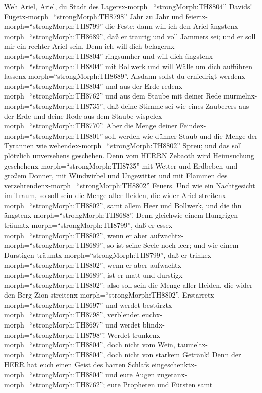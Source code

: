  Weh Ariel, Ariel, du Stadt des
Lagersx-morph=``strongMorph:TH8804'' Davids!
Fügetx-morph=``strongMorph:TH8798'' Jahr zu Jahr und
feiertx-morph=``strongMorph:TH8799'' die Feste;  dann will
ich den Ariel ängstenx-morph=``strongMorph:TH8689'', daß er traurig und
voll Jammers sei; und er soll mir ein rechter Ariel sein. 
Denn ich will dich belagernx-morph=``strongMorph:TH8804'' ringsumher und
will dich ängstenx-morph=``strongMorph:TH8804'' mit Bollwerk und will
Wälle um dich aufführen lassenx-morph=``strongMorph:TH8689''.
 Alsdann sollst du erniedrigt
werdenx-morph=``strongMorph:TH8804'' und aus der Erde
redenx-morph=``strongMorph:TH8762'' und aus dem Staube mit deiner Rede
murmelnx-morph=``strongMorph:TH8735'', daß deine Stimme sei wie eines
Zauberers aus der Erde und deine Rede aus dem Staube
wispelex-morph=``strongMorph:TH8770''.  Aber die Menge
deiner Feindex-morph=``strongMorph:TH8801'' soll werden wie dünner Staub
und die Menge der Tyrannen wie wehendex-morph=``strongMorph:TH8802''
Spreu; und das soll plötzlich unversehens geschehen.  Denn
vom HERRN Zebaoth wird Heimsuchung
geschehenx-morph=``strongMorph:TH8735'' mit Wetter und Erdbeben und
großem Donner, mit Windwirbel und Ungewitter und mit Flammen des
verzehrendenx-morph=``strongMorph:TH8802'' Feuers.  Und wie
ein Nachtgesicht im Traum, so soll sein die Menge aller Heiden, die
wider Ariel streitenx-morph=``strongMorph:TH8802'', samt allem Heer und
Bollwerk, und die ihn ängstenx-morph=``strongMorph:TH8688''.
 Denn gleichwie einem Hungrigen
träumtx-morph=``strongMorph:TH8799'', daß er
essex-morph=``strongMorph:TH8802'', wenn er aber
aufwachtx-morph=``strongMorph:TH8689'', so ist seine Seele noch leer;
und wie einem Durstigen träumtx-morph=``strongMorph:TH8799'', daß er
trinkex-morph=``strongMorph:TH8802'', wenn er aber
aufwachtx-morph=``strongMorph:TH8689'', ist er matt und
durstigx-morph=``strongMorph:TH8802'': also soll sein die Menge aller
Heiden, die wider den Berg Zion streitenx-morph=``strongMorph:TH8802''.
 Erstarretx-morph=``strongMorph:TH8697'' und werdet
bestürztx-morph=``strongMorph:TH8798'', verblendet
euchx-morph=``strongMorph:TH8697'' und werdet
blindx-morph=``strongMorph:TH8798''! Werdet
trunkenx-morph=``strongMorph:TH8804'', doch nicht vom Wein,
taumeltx-morph=``strongMorph:TH8804'', doch nicht von starkem Getränk!
 Denn der HERR hat euch einen Geist des harten Schlafs
eingeschenktx-morph=``strongMorph:TH8804'' und eure Augen
zugetanx-morph=``strongMorph:TH8762''; eure Propheten und Fürsten samt
